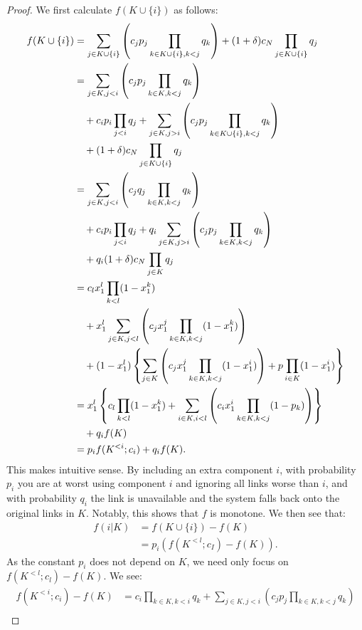 \documentclass[10pt,a4paper]{amsart}
\begin{document}
\begin{proof}
We first calculate $f(K\cup \{i\})$ as follows:
\begin{align*}
    f(K\cup\{i\}) &= \sum_{j\in K\cup\{i\}}\left( c_j p_j \prod_{k\in K\cup\{i\}, k<j}q_k\right) + (1+\delta)c_N\prod_{j\in K\cup\{i\}}q_j\\
    &= \sum_{j\in K, j < i}\left( c_j p_j \prod_{k\in K, k<j}q_k\right)\\
    &\quad+ c_ip_i\prod_{j < i}q_j
    + \sum_{j\in K, j > i}\left( c_j p_j \prod_{k\in K \cup \{i\}, k<j}q_k\right)\\
    &\quad+ (1+\delta)c_N \prod_{j\in K \cup \{i\}}q_j\\
    &= \sum_{j\in K, j < i}\left( c_j q_j \prod_{k\in K, k<j}q_k\right)\\
    &\quad+ c_ip_i\prod_{j < i}q_j
    + q_i\sum_{j\in K, j > i}\left( c_j p_j \prod_{k\in K, k<j}q_k\right)\\
    &\quad+ q_i(1+\delta)c_N \prod_{j\in K}q_j\\\vspace{1em}
    &= c_lx_1^l\prod_{k < l}(1 - x_1^k)\\
    &\quad+x_1^l\sum_{j\in K, j < l}\left( c_j x_1^j \prod_{k\in K, k<j}(1 - x_1^k)\right)\\
    &\quad+(1 - x_1^l)\left\{\sum_{j\in K}\left( c_j x_1^j \prod_{k\in K, k<j}(1 - x_1^i)\right) + p \prod_{i\in K}(1 - x_1^i)\right\}\\\vspace{1em}
    &= x_1^l\left\{c_l\prod_{k < l}(1 - x_1^k) + \sum_{i\in K, i < l}\left( c_i x_1^i \prod_{k\in K, k<j}(1 - p_k)\right)\right\}\\
    &\quad+ q_if(K)\\\vspace{1em}
    &= p_i f(K^{<i};c_i) + q_if(K).
\end{align*}
This makes intuitive sense. By including an extra component $i$, with probability $p_i$ you are at worst using component $i$ and ignoring all links worse than $i$, and with probability $q_i$ the link is unavailable and the system falls back onto the original links in $K$. Notably, this shows that $f$ is monotone. We then see that:
\begin{align*}
    f(i|K) &= f(K\cup\{i\}) - f(K)\\
    &= p_i\left(f(K^{<l};c_I) - f(K)\right).
\end{align*}
As the constant $p_i$ does not depend on $K$, we need only focus on $f(K^{<l};c_l) - f(K)$. We see:
\begin{align*}
    f(K^{<i};c_i) - f(K) &= c_i\prod_{k\in K, k < i}q_k + \sum_{j\in K, j < i}\left( c_j p_j \prod_{k\in K, k<j}q_k\right)\\

\end{align*}
\end{proof}
\end{document}
